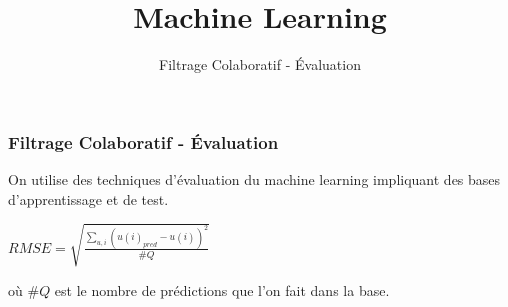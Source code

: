 \documentclass{formation}
\title{Machine Learning}
\subtitle{Filtrage Colaboratif - Évaluation}
\begin{document}
\maketitle

\begin{frame}
  \frametitle{Filtrage Colaboratif - Évaluation}
  On utilise des techniques d'évaluation du machine learning impliquant des bases d'apprentissage et de test.
  \begin{center}
    $RMSE = \sqrt{\frac{\sum_{u,i}(u(i)_{pred}-u(i))^2}{\#Q}}$
  \end{center}
  où $\#Q$ est le nombre de prédictions que l'on fait dans la base.
\end{frame}
\end{document}
